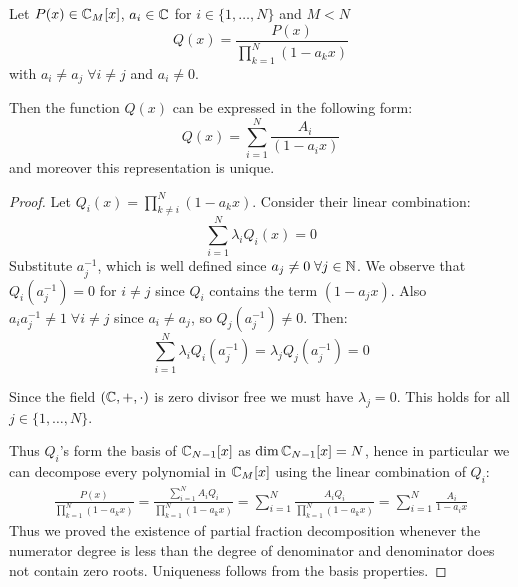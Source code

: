 \begin{lemma} \label{lm:partial fraction}
    Let $P(x) \in \mathbb{C}_M[x]$, $a_i \in \mathbb{C}$ for $i \in \{1, \dots, N\}$ and $M<N$
    \[Q(x) = \frac{P(x)}{\prod_{k=1}^{N} (1-a_kx)}\]
    with $a_i \neq a_j \;\forall i\neq j$ and $a_i \neq 0$.

    Then the function $Q(x)$ can be expressed in the following form:
    \[Q(x) = \sum_{i=1}^{N} \frac{A_i}{(1-a_i x)}\]
    and moreover this representation is unique.
\end{lemma}
\begin{proof}
    Let $Q_i(x) = \prod_{k\neq i}^{N} (1-a_kx)$. Consider their linear combination:
    \[\sum_{i=1}^{N} \lambda_i Q_i(x) = 0\]
    Substitute $a_j^{-1}$, which is well defined since $a_j \neq 0 \; \forall j\in \mathbb{N}$. We observe that $Q_i(a_j^{-1}) = 0$ for $i\neq j$ since $Q_i$ contains the term $(1-a_jx)$. Also $a_ia_j^{-1} \neq 1 \; \forall i\neq j$ since $a_i \neq a_j$, so $Q_j(a_j^{-1}) \neq 0$. Then:
    \[\sum_{i=1}^{N} \lambda_i Q_i(a_j^{-1}) = \lambda_j Q_j(a_j^{-1}) = 0\]

    Since the field $(\mathbb{C}, +, \cdot)$ is zero divisor free we must have $\lambda_j = 0$. This holds for all $j\in \{1, \dots, N\}$.

    Thus $Q_i$'s form the basis of $\mathbb{C}_{N-1}[x]$ as $\dim \mathbb{C}_{N-1}[x] = N$, hence in particular we can decompose every polynomial in $\mathbb{C}_{M}[x]$ using the linear combination of $Q_i$:
    \begin{align*}
        \frac{P(x)}{\prod_{k=1}^{N} (1-a_kx)}
        = \frac{\sum_{i=1}^{N} A_i Q_i}{\prod_{k=1}^{N} (1-a_kx)}
        = \sum_{i=1}^{N} \frac{A_i Q_i}{\prod_{k=1}^{N} (1-a_kx)}
        = \sum_{i=1}^{N} \frac{A_i}{1-a_ix}
    \end{align*}
    Thus we proved the existence of partial fraction decomposition whenever the numerator degree is less than the degree of denominator and denominator does not contain zero roots. Uniqueness follows from the basis properties.
\end{proof}

